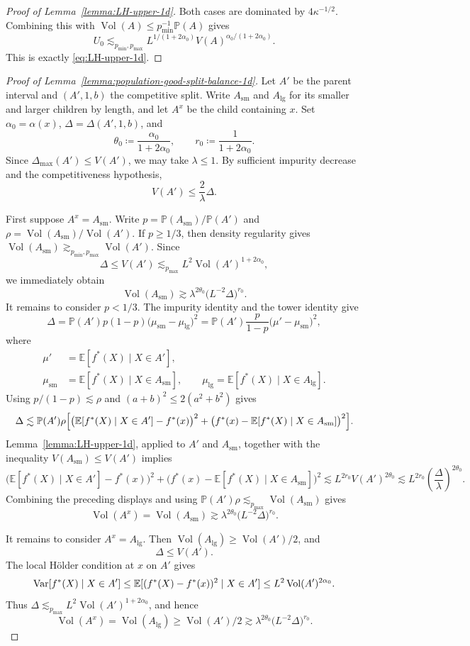 \documentclass[11pt]{article}
\theoremstyle{plain}
\theoremstyle{definition}
\theoremstyle{remark}
\theoremstyle{plain}
\renewcommand{\P}{\mathbb{P}}
\newcommand{\E}{\mathbb{E}}
\newcommand{\Var}{\textnormal{Var}}
\DeclareMathOperator{\Vol}{Vol}
\newcommand{\1}{\mathbbm{1}}
\begin{document}
\begin{proof}[Proof of Lemma~\ref{lemma:LH-upper-1d}]
Both cases are dominated by $4\kappa^{-1/2}$. Combining this with
$\Vol(A)\le p_{\min}^{-1}\P(A)$ gives
\[
U_0
\lesssim_{p_{\min},p_{\max}}
L^{1/(1+2\alpha_0)}V(A)^{\alpha_0/(1+2\alpha_0)}.
\]
This is exactly \eqref{eq:LH-upper-1d}.
\end{proof}

\begin{proof}[Proof of Lemma~\ref{lemma:population-good-split-balance-1d}]
Let $A'$ be the parent interval and $(A',1,b)$ the competitive split.
Write $A_{\mathrm{sm}}$ and $A_{\mathrm{lg}}$ for its smaller and larger
children by length, and let $A^x$ be the child containing $x$. Set
$\alpha_0=\alpha(x)$, $\Delta=\Delta(A',1,b)$, and
\[
\theta_0\coloneqq\frac{\alpha_0}{1+2\alpha_0},
\qquad
r_0\coloneqq\frac{1}{1+2\alpha_0}.
\]
Since $\Delta_{\max}(A')\le V(A')$, we may take $\lambda\le1$.
By sufficient impurity decrease and the competitiveness hypothesis,
\[
V(A')\le \frac{2}{\lambda}\Delta.
\]

First suppose $A^x=A_{\mathrm{sm}}$. Write
$p=\P(A_{\mathrm{sm}})/\P(A')$ and
$\rho=\Vol(A_{\mathrm{sm}})/\Vol(A')$.
If $p\ge 1/3$, then density regularity gives
$\Vol(A_{\mathrm{sm}})\gtrsim_{p_{\min},p_{\max}}\Vol(A')$. Since
\[
\Delta\le V(A')\lesssim_{p_{\max}}L^2\Vol(A')^{1+2\alpha_0},
\]
we immediately obtain
\[
\Vol(A_{\mathrm{sm}})
\gtrsim
\lambda^{2\theta_0}
\bigl(L^{-2}\Delta\bigr)^{r_0}.
\]
It remains to consider $p<1/3$. The impurity identity and the tower identity give
\[
\Delta
=
\P(A')p(1-p)
\bigl(\mu_{\mathrm{sm}}-\mu_{\mathrm{lg}}\bigr)^2
=
\P(A')\frac{p}{1-p}
\bigl(\mu'-\mu_{\mathrm{sm}}\bigr)^2,
\]
where 
\[
\begin{aligned}
\mu'&=\E[f^*(X)\mid X\in A'],\\
\mu_{\mathrm{sm}}&=\E[f^*(X)\mid X\in A_{\mathrm{sm}}],\qquad
\mu_{\mathrm{lg}}=\E[f^*(X)\mid X\in A_{\mathrm{lg}}].
\end{aligned}
\]
Using $p/(1-p)\lesssim \rho$ and $(a+b)^2\le2(a^2+b^2)$ gives
\[
\Delta
\lesssim
\P(A')\rho
\Bigl[
\bigl(\E[f^*(X)\mid X\in A']-f^*(x)\bigr)^2
+
\bigl(f^*(x)-\E[f^*(X)\mid X\in A_{\mathrm{sm}}]\bigr)^2
\Bigr].
\]
Lemma~\ref{lemma:LH-upper-1d}, applied to $A'$ and
$A_{\mathrm{sm}}$, together with the inequality $V(A_{\mathrm{sm}})\le V(A')$
implies
\[
\bigl(\E[f^*(X)\mid X\in A']-f^*(x)\bigr)^2
+
\bigl(f^*(x)-\E[f^*(X)\mid X\in A_{\mathrm{sm}}]\bigr)^2
\lesssim
L^{2r_0}V(A')^{2\theta_0}
\lesssim
L^{2r_0}
\left(\frac{\Delta}{\lambda}\right)^{2\theta_0}.
\]
Combining the preceding displays and using
$\P(A')\rho\lesssim_{p_{\max}}\Vol(A_{\mathrm{sm}})$ gives
\[
\Vol(A^x)
=\Vol(A_{\mathrm{sm}})
\gtrsim
\lambda^{2\theta_0}
\bigl(L^{-2}\Delta\bigr)^{r_0}.
\]

It remains to consider $A^x=A_{\mathrm{lg}}$. Then
$\Vol(A_{\mathrm{lg}})\ge\Vol(A')/2$, and
\[
\Delta\le V(A').
\]
The local H\"older condition at $x$ on $A'$ gives
\[
\Var[f^*(X)\mid X\in A']
\le
\E[(f^*(X)-f^*(x))^2\mid X\in A']
\le
L^2\Vol(A')^{2\alpha_0}.
\]
Thus $\Delta\lesssim_{p_{\max}}L^2\Vol(A')^{1+2\alpha_0}$, and hence
\[
\Vol(A^x)
=\Vol(A_{\mathrm{lg}})
\ge \Vol(A')/2
\gtrsim
\lambda^{2\theta_0}
\bigl(L^{-2}\Delta\bigr)^{r_0}.
\]
\end{proof}
\end{document}

